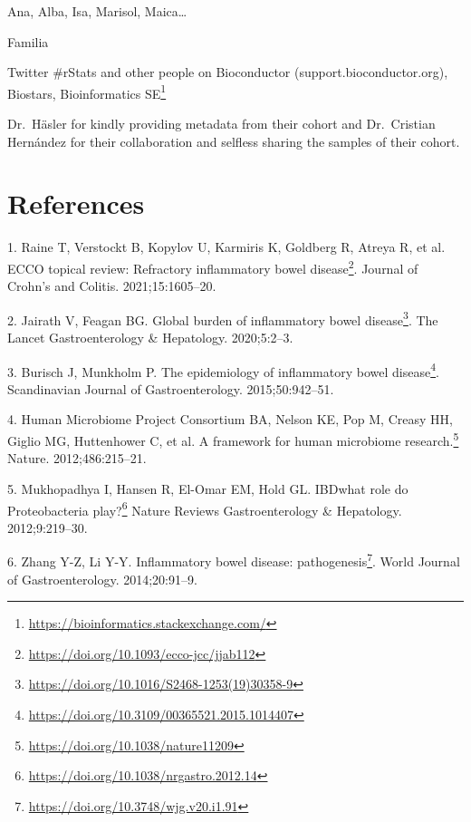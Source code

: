 \documentclass[
  a4paper,
]{book}
\DeclareRobustCommand{\href}[2]{#2\footnote{\url{#1}}}
\newlength{\cslhangindent}
\newlength{\cslentryspacingunit} %
\newenvironment{CSLReferences}[2] %
 {%
  \setlength{\parindent}{0pt}
  \ifodd #1
  \let\oldpar\par
  \def\par{\hangindent=\cslhangindent\oldpar}
  \fi
  \setlength{\parskip}{#2\cslentryspacingunit}
 }%
 {}
\begin{document}
Ana, Alba, Isa, Marisol, Maica\ldots{}

Familia

Twitter \#rStats and other people on Bioconductor (support.bioconductor.org), Biostars, \href{https://bioinformatics.stackexchange.com/}{Bioinformatics SE}

Dr.~Häsler for kindly providing metadata from their cohort and Dr.~Cristian Hernández for their collaboration and selfless sharing the samples of their cohort.

\hypertarget{references}{%
\chapter*{References}\label{references}}

\hypertarget{refs}{}
\begin{CSLReferences}{0}{0}
\leavevmode{}%
1. Raine T, Verstockt B, Kopylov U, Karmiris K, Goldberg R, Atreya R, et al. \href{https://doi.org/10.1093/ecco-jcc/jjab112}{ECCO topical review: Refractory inflammatory bowel disease}. Journal of Crohn's and Colitis. 2021;15:1605--20.

\leavevmode{}%
2. Jairath V, Feagan BG. \href{https://doi.org/10.1016/S2468-1253(19)30358-9}{Global burden of inflammatory bowel disease}. The Lancet Gastroenterology \& Hepatology. 2020;5:2--3.

\leavevmode{}%
3. Burisch J, Munkholm P. \href{https://doi.org/10.3109/00365521.2015.1014407}{The epidemiology of inflammatory bowel disease}. Scandinavian Journal of Gastroenterology. 2015;50:942--51.

\leavevmode{}%
4. Human Microbiome Project Consortium BA, Nelson KE, Pop M, Creasy HH, Giglio MG, Huttenhower C, et al. \href{https://doi.org/10.1038/nature11209}{A framework for human microbiome research.} Nature. 2012;486:215--21.

\leavevmode{}%
5. Mukhopadhya I, Hansen R, El-Omar EM, Hold GL. \href{https://doi.org/10.1038/nrgastro.2012.14}{IBD{\textemdash}what role do Proteobacteria play?} Nature Reviews Gastroenterology \& Hepatology. 2012;9:219--30.

\leavevmode{}%
6. Zhang Y-Z, Li Y-Y. \href{https://doi.org/10.3748/wjg.v20.i1.91}{Inflammatory bowel disease: pathogenesis}. World Journal of Gastroenterology. 2014;20:91--9.


\end{CSLReferences}
\end{document}
